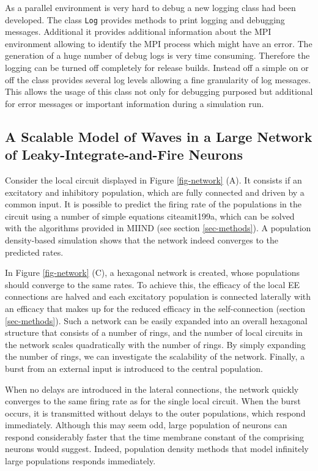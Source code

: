 \documentclass[12pt]{article}
\begin{document}
As a parallel environment is very hard to debug a new logging class had been developed.
The class \texttt{Log} provides methods to print logging and debugging messages.
Additional it provides additional information about the MPI environment allowing to identify the MPI process which might have an error.
The generation of a huge number of debug logs is very time consuming. Therefore the logging can be turned off completely for release builds.
Instead off a simple on or off the class provides several log levels allowing a fine granularity of log messages.
This allows the usage of this class not only for debugging purposed but additional for error messages or important information during a simulation run.

\subsection{A Scalable Model of Waves in a Large Network of Leaky-Integrate-and-Fire Neurons}
Consider the local circuit displayed in Figure \ref{fig-network} (A). It consists if an excitatory and inhibitory population, which are fully connected
and driven by a common input. It is possible to predict the firing rate of the populations in the circuit using a number of simple equations
cite{amit199a}, which can be solved with the algorithms provided in MIIND (see section \ref{sec-methods}). A population density-based simulation
shows that the network indeed converges to the predicted rates.

In Figure \ref{fig-network} (C), a hexagonal network is created, whose populations should converge to the same rates. To achieve this, the efficacy
of the local EE connections are halved and each excitatory population is connected laterally with an efficacy that makes up for the reduced
efficacy in the self-connection (section \ref{sec-methods}). Such a network can be easily expanded into an overall hexagonal structure that consists
of a number of rings, and the number of local circuits in the network scales quadratically with the number of rings. By simply expanding the number
of rings, we can investigate the scalability of the network. Finally, a burst from an external input is introduced to the central population.

When no delays are introduced in the lateral connections, the network quickly converges to the same firing rate as for the single local circuit. When
the burst occurs, it is transmitted without delays to the outer populations, which respond immediately. Although this may seem odd, large population
of neurons can respond considerably faster that the time membrane constant of the comprising neurons would suggest. Indeed, population density methods
that model infinitely large populations responds immediately.
 
\end{document}
